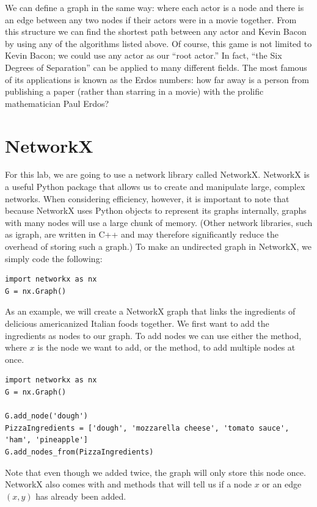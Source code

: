 We can define a graph in the same way: where each actor is a node and there is an edge between any two nodes if their actors were in a movie together. From this structure we can find
the shortest path between any actor and Kevin Bacon by using any of the algorithms listed above. Of course, this game is not limited to Kevin Bacon; we could use any actor as our ``root actor.''
In fact, ``the Six Degrees of Separation'' can be applied to many different fields. The most famous of its applications is known as the Erdos numbers: how far away is a person
 from publishing a paper (rather than starring in a movie) with the prolific mathematician Paul Erdos?

\section*{NetworkX}
For this lab, we are going to use a network library called NetworkX. NetworkX is a useful Python package that allows us to create and manipulate large, complex networks.
When considering efficiency, however, it is important to note that because NetworkX uses Python objects to represent its graphs internally, graphs with many nodes will
use a large chunk of memory. (Other network libraries, such as igraph, are written in C++ and may therefore significantly reduce the overhead of storing such a graph.)
To make an undirected graph in NetworkX, we simply code the following:

\begin{lstlisting}
import networkx as nx
G = nx.Graph()
\end{lstlisting}

As an example, we will create a NetworkX graph that links the ingredients of
delicious americanized Italian foods together. We first want to add the ingredients as nodes
to our graph. To add nodes we can use either the  method, where $x$
is the node we want to add, or the  method, to
add multiple nodes at once.

\begin{lstlisting}
import networkx as nx
G = nx.Graph()

G.add_node('dough')
PizzaIngredients = ['dough', 'mozzarella cheese', 'tomato sauce', 'ham', 'pineapple']
G.add_nodes_from(PizzaIngredients)
\end{lstlisting}
Note that even though we added  twice, the graph will only store this node once. NetworkX also comes with  and  methods that will tell
us if a node $x$ or an edge $(x,y)$ has already been added.

